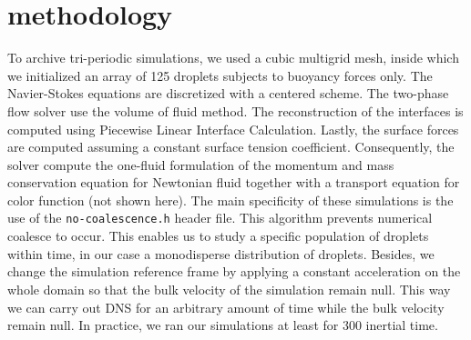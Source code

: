 \documentclass[9pt,a4paper]{article}
\begin{document}
\section*{methodology}
\setlength{\parindent}{10pt}
To archive tri-periodic simulations, we used a cubic multigrid mesh,
inside which we initialized an array of 125 droplets subjects to buoyancy forces only. 
The Navier-Stokes equations are discretized with a centered scheme. 
The two-phase flow solver use the volume of fluid method.
The reconstruction of the interfaces is computed using Piecewise Linear Interface Calculation. 
Lastly, the surface forces are computed assuming a constant surface tension coefficient. 
Consequently, the solver compute the one-fluid formulation of the momentum and mass conservation equation for Newtonian fluid together with a transport equation for color function (not shown here). 
The main specificity of these simulations is the use of the \texttt{no-coalescence.h} header file.
This algorithm prevents numerical coalesce to occur. 
This enables us to study a specific population of droplets within time, in our case a monodisperse distribution of droplets.
Besides, we change the simulation reference frame by applying a constant acceleration on the whole domain so that the bulk velocity of the simulation remain null.
This way we can carry out DNS for an arbitrary amount of time while the bulk velocity remain null. 
In practice, we ran our simulations at least for 300 inertial time. 
\end{document}
